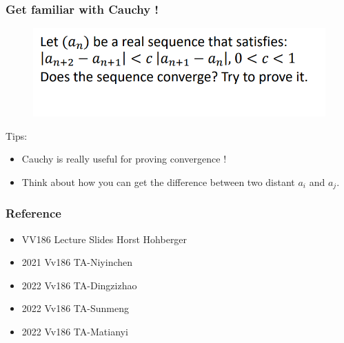 \documentclass{beamer}
\begin{document}
\begin{frame}
    \frametitle{Get familiar with Cauchy !}
    \begin{figure}[htbp]
        \centering
        \includegraphics[width=12cm]{challenge.png}
    \end{figure}

    Tips:
    \begin{itemize}
        \item Cauchy is really useful for proving convergence !
        \item Think about how you can get the difference between two distant $a_{i}$ and $a_{j}$.
    \end{itemize}
\end{frame}


\begin{frame}
    \frametitle{Reference}
    \begin{itemize}
        \item VV186 Lecture Slides Horst Hohberger
        \item 2021 Vv186 TA-Niyinchen
        \item 2022 Vv186 TA-Dingzizhao
        \item 2022 Vv186 TA-Sunmeng
        \item 2022 Vv186 TA-Matianyi
    \end{itemize}

\end{frame}
\end{document}
